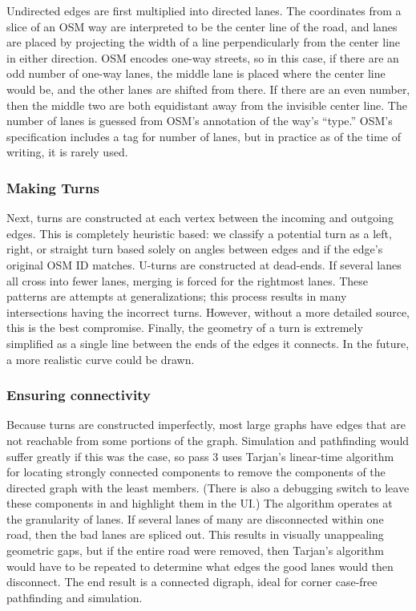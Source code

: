 \documentclass[12pt]{article}
\begin{document}
Undirected edges are first multiplied into directed lanes. The coordinates from
a slice of an OSM way are interpreted to be the center line of the road, and
lanes are placed by projecting the width of a line perpendicularly from the
center line in either direction. OSM encodes one-way streets, so in this case,
if there are an odd number of one-way lanes, the middle lane is placed where the
center line would be, and the other lanes are shifted from there. If there are
an even number, then the middle two are both equidistant away from the invisible
center line. The number of lanes is guessed from OSM's annotation of the way's
``type.'' OSM's specification includes a tag for number of lanes, but in
practice as of the time of writing, it is rarely used.

\subsubsection{Making Turns}

Next, turns are constructed at each vertex between the incoming and outgoing
edges. This is completely heuristic based: we classify a potential turn as a
left, right, or straight turn based solely on angles between edges and if the
edge's original OSM ID matches. U-turns are constructed at dead-ends. If several
lanes all cross into fewer lanes, merging is forced for the rightmost lanes.
These patterns are attempts at generalizations; this process results in many
intersections having the incorrect turns. However, without a more detailed
source, this is the best compromise. Finally, the geometry of a turn is
extremely simplified as a single line between the ends of the edges it connects.
In the future, a more realistic curve could be drawn.

\subsubsection{Ensuring connectivity}

Because turns are constructed imperfectly, most large graphs have edges that are
not reachable from some portions of the graph. Simulation and pathfinding would
suffer greatly if this was the case, so pass 3 uses Tarjan's linear-time
algorithm for locating strongly connected components to remove the components of
the directed graph with the least members. (There is also a debugging switch to
leave these components in and highlight them in the UI.) The algorithm operates
at the granularity of lanes. If several lanes of many are disconnected within
one road, then the bad lanes are spliced out. This results in visually
unappealing geometric gaps, but if the entire road were removed, then Tarjan's
algorithm would have to be repeated to determine what edges the good lanes would
then disconnect. The end result is a connected digraph, ideal for corner
case-free pathfinding and simulation.
\end{document}
